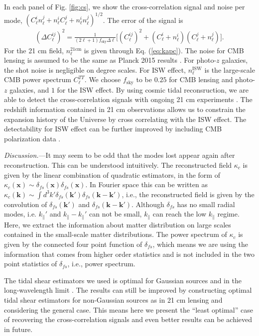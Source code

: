 \documentclass[aps,prl,twocolumn,showpacs,superscriptaddress,groupedaddress,nofootinbib,floatfix]{revtex4}  %
\newcommand{\mr}{\mathrm}
\begin{document}
In each panel of Fig. \ref{fig:cs}, we show the cross-correlation signal and 
noise per mode, 
$(C_\ell^in_\ell^j+n_\ell^iC_\ell^j+n^i_\ell n^j_\ell)^{1/2}$.
The error of the signal is 
\begin{eqnarray}
(\Delta C_\ell^{ij})^2=\frac{1}{(2\ell+1)f_\mr{sky}\Delta\ell}
\bigg[{(C_\ell^{ij})^2+(C_\ell^{i}+n_\ell^{i})
(C_\ell^{j}+n_\ell^{j})}\bigg].
\end{eqnarray}
For the 21 cm field, $n_\ell^\mr{21cm}$ is given through Eq. (\ref{eq:kapc}). 
The noise for CMB lensing is assumed to be the same as Planck 2015 results 
\cite{2015:plancklensing}. For photo-$z$ galaxies, the shot noise is negligible
on degree scales. For ISW effect, $n_\ell^\mr{ISW}$ is the large-scale
CMB power spectrum $C_\ell^{TT}$. We choose $f_\mr{sky}$ to be $0.25$ for 
CMB lensing and photo-$z$ galaxies, and $1$ for the ISW effect. By
using cosmic tidal reconsruction, we are able to detect the cross-correlation
signals with ongoing 21 cm experiments \cite{2014SPIE.9145E..22B,2015ApJ...798...40X,HIRAX}. 
The redshift information contained in 21 cm observations allows us to constrain
the expansion history of the Universe by cross correlating with the ISW effect.
The detectability for ISW effect can be further improved by including CMB 
polarization data \cite{2011PhRvD..83f3001L}.

{\it Discussion.}---It may seem to be odd that the modes lost appear again
after reconstruction. This can be understood intuitively.
The reconstructed field $\kappa_c$ is given by the linear combination of 
quadratic estimators, in the form of 
$\kappa_c(\bm{x})\sim\delta_{fs}(\bm{x})\delta_{fs}(\bm{x})$. In Fourier 
space this can be written as $\kappa_c(\bm{k})\sim\int d^3k'
\delta_{fs}(\bm{k}')\delta_{fs}(\bm{k}-\bm{k}')$, i.e., the reconstructed 
field is given by the convolution of $\delta_{fs}(\bm{k}')$ and 
$\delta_{fs}(\bm{k}-\bm{k}')$. Although $\delta_{fs}$ has no small radial
modes, i.e. $k_{\parallel}'$ and $k_\parallel-k_{\parallel}'$ can not be small,
$k_\parallel$ can reach the low $k_\parallel$ regime.
Here, we extract the information about matter distribution on large scales 
contained in the small-scale matter distributions. The power spectrum of 
$\kappa_c$ is given by the connected four point function of $\delta_{fs}$,
which means we are using the information that comes from higher order statistics
and is not included in the two point statistics of $\delta_{fs}$, i.e., 
power spectrum.

The tidal shear estimators we used is optimal for Gaussian sources and in the 
long-wavelength limit \cite{2015:zhu}.
The results can still be improved by constructing optimal tidal shear 
estimators for non-Gaussian sources as in 21 cm lensing \cite{2010:lu} and 
considering the general case. This means here we present the ``least optimal''
case of recovering the cross-correlation signals and even better results can be
achieved in future.
\end{document}
